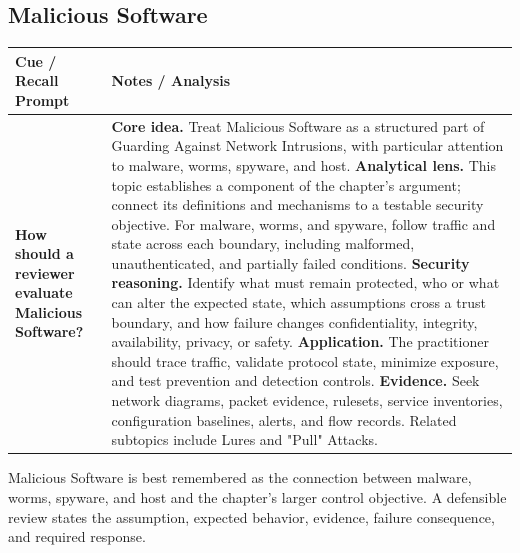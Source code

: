 \documentclass[11pt]{article}
\newcommand{\CornellHeader}{%
\rowcolor{Navy}\color{white}\bfseries Cue / Recall Prompt & \color{white}\bfseries Notes / Analysis\\\hline}
\newcommand{\CornellRow}[2]{%
\cellcolor{CueGray}\RaggedRight\textbf{#1} & \RaggedRight #2\\\hline}
\begin{document}
\subsection*{Malicious Software}
\begin{longtable}{>{\RaggedRight\arraybackslash}p{}|>{\RaggedRight\arraybackslash}p{}}
\CornellHeader
\CornellRow{How should a reviewer evaluate Malicious Software?}{\textbf{Core idea.} Treat Malicious Software as a structured part of Guarding Against Network Intrusions, with particular attention to malware, worms, spyware, and host. \textbf{Analytical lens.} This topic establishes a component of the chapter's argument; connect its definitions and mechanisms to a testable security objective. For malware, worms, and spyware, follow traffic and state across each boundary, including malformed, unauthenticated, and partially failed conditions. \textbf{Security reasoning.} Identify what must remain protected, who or what can alter the expected state, which assumptions cross a trust boundary, and how failure changes confidentiality, integrity, availability, privacy, or safety. \textbf{Application.} The practitioner should trace traffic, validate protocol state, minimize exposure, and test prevention and detection controls. \textbf{Evidence.} Seek network diagrams, packet evidence, rulesets, service inventories, configuration baselines, alerts, and flow records. Related subtopics include Lures and "Pull" Attacks.}
\end{longtable}
\begin{topicsummary}
Malicious Software is best remembered as the connection between malware, worms, spyware, and host and the chapter's larger control objective. A defensible review states the assumption, expected behavior, evidence, failure consequence, and required response.
\end{topicsummary}
\end{document}
